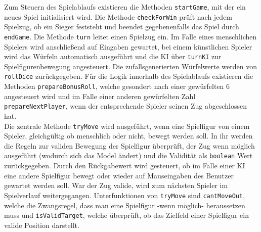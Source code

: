 \documentclass[conference]{IEEEtran}
\begin{document}
Zum Steuern des Spielablaufs existieren die Methoden \texttt{startGame}, mit der ein neues Spiel initialisiert wird.
Die Methode \texttt{checkForWin} pr\"uft nach jedem Spielzug, ob ein Sieger feststeht und beendet gegebenenfalls das Spiel durch
\texttt{endGame}.
Die Methode \texttt{turn} leitet einen Spielzug ein. Im Falle eines menschlichen Spielers wird anschlie\ss end auf Eingaben gewartet, bei einem k\"unstlichen Spieler wird das W\"urfeln automatisch ausgef\"uhrt und die KI \"uber \texttt{turnKI} zur Spielfigurenbewegung angesteuert. Die zufallsgenerierten W\"urfelwerte
werden von \texttt{rollDice} zur\"uckgegeben. F\"ur die Logik innerhalb des Spielablaufs existieren die Methoden
\texttt{prepareBonusRoll}, welche gesondert nach einer gew\"urfelten 6 angesteuert wird und im Falle einer anderen gew\"urfelten Zahl
\texttt{prepareNextPlayer}, wenn der entsprechende Spieler seinen Zug abgeschlossen hat.\\
Die zentrale Methode \texttt{tryMove} wird ausgef\"uhrt, wenn eine Spielfigur von einem Spieler, gleichg\"ultig ob menschlich oder nicht, bewegt werden soll. In ihr werden die Regeln zur validen Bewegung der Spielfigur \"uberpr\"uft, der Zug wenn m\"oglich ausgef\"uhrt (wodurch sich das Model \"andert) und die Validit\"at als \texttt{boolean} Wert zur\"uckgegeben. Durch den R\"uckgabewert wird gesteuert, ob im Falle einer KI eine andere Spielfigur bewegt oder wieder auf Mauseingaben des Benutzer gewartet werden soll. War der Zug valide, wird zum n\"achsten Spieler im Spielverlauf weitergegangen. Unterfunktionen von \texttt{tryMove} sind \texttt{cantMoveOut}, welche die Zwangsregel, dass man eine Spielfigur -wenn m\"oglich- heraussetzen muss und
\texttt{isValidTarget}, welche \"uberpr\"uft, ob das Zielfeld einer Spielfigur ein valide Position darstellt.
\end{document}
